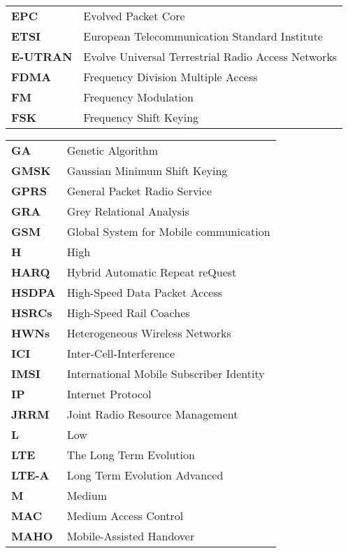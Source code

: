 \begin{table}[h]
\begin{adjustbox}{max width=\textwidth}
\begin{tabular}{ll}
\textbf{EPC}&Evolved Packet Core  \\		
\textbf{ETSI}&European Telecommunication Standard Institute   \\			
\textbf{E-UTRAN}&Evolve Universal Terrestrial Radio Access Networks   \\
\textbf{FDMA}&Frequency Division Multiple Access   \\			
\textbf{FM}&Frequency Modulation   \\
\textbf{FSK}&Frequency Shift Keying   \\		
\end{tabular}
\end{adjustbox}
\end{table}		
									
\begin{table}[h] \centering
\begin{adjustbox}{max width=\textwidth}
\begin{tabular}{ll}		
\textbf{GA}&Genetic Algorithm   \\
\textbf{GMSK}&Gaussian Minimum Shift Keying  \\		
\textbf{GPRS}&General Packet Radio Service \\			
\textbf{GRA}&Grey Relational Analysis  \\			
\textbf{GSM}&Global System for Mobile communication  \\ 
\textbf{H}&High  \\ 
\textbf{HARQ}&Hybrid Automatic Repeat reQuest  \\		
\textbf{HSDPA}&High-Speed Data Packet Access  \\			
\textbf{HSRCs}&High-Speed Rail Coaches  \\			
\textbf{HWNs}&Heterogeneous Wireless Networks  \\ 
\textbf{ICI}& Inter-Cell-Interference		  \\	 	
\textbf{IMSI}&International Mobile Subscriber Identity  \\		
\textbf{IP}&Internet Protocol  \\
\textbf{JRRM}&Joint Radio Resource Management   \\	
\textbf{L}& Low \\			 
\textbf{LTE}& The Long Term Evolution  \\			
\textbf{LTE-A}&Long Term Evolution Advanced  \\		
\textbf{M}&Medium \\ 	
\textbf{MAC}& Medium Access Control \\			
\textbf{MAHO}&Mobile-Assisted Handover \\			

\end{tabular}
\end{adjustbox}
\end{table}
